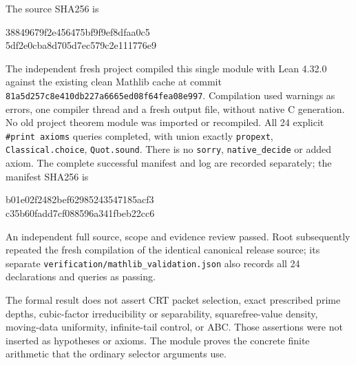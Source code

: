 The source SHA256 is
\begin{center}\small\ttfamily
38849679f2e456475bf9f9ef8dfaa0c5\\
5df2e0cba8d705d7ec579c2e111776e9
\end{center}
The independent fresh project compiled this single module with
Lean 4.32.0 against the existing clean Mathlib cache at commit
\texttt{81a5d257c8e410db\allowbreak{}227a6665ed08f64f\allowbreak{}ea08e997}.
Compilation used warnings as errors, one compiler thread and a
fresh output file, without native C generation. No old project
theorem module was imported or recompiled. All 24 explicit
\texttt{\#print axioms} queries completed, with union exactly
\texttt{propext}, \texttt{Classical.choice}, \texttt{Quot.sound}.
There is no \texttt{sorry}, \texttt{native\_decide} or added axiom.
The complete successful manifest and log are recorded separately;
the manifest SHA256 is
\begin{center}\small\ttfamily
b01e02f2482bef62985243547185acf3\\
c35b60fadd7cf088596a341fbeb22cc6
\end{center}
An independent full source, scope and evidence review passed.
Root subsequently repeated the fresh compilation of the identical
canonical release source; its separate
\texttt{verification/\allowbreak{}mathlib\_validation.json} also
records all 24 declarations and queries as passing.

The formal result does not assert CRT packet selection, exact
prescribed prime depths, cubic-factor irreducibility or separability,
squarefree-value density, moving-data uniformity, infinite-tail
control, or ABC. Those assertions were not inserted as hypotheses
or axioms. The module proves the concrete finite arithmetic that
the ordinary selector arguments use.
